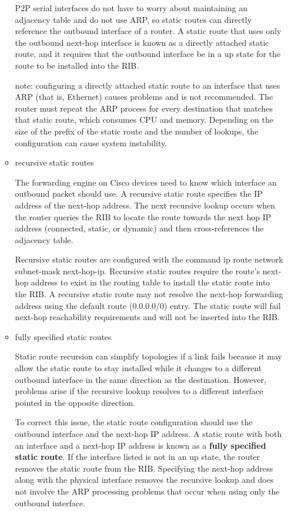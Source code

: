 \documentclass{article}
\begin{document}
\begin{itemize}
\begin{itemize}
		P2P serial interfaces do not have to worry about maintaining an adjacency table and do not use ARP, so static routes can directly reference the outbound interface of a router. A static route that uses only the outbound next-hop interface is known as a directly attached static route, and it requires that the outbound interface be in a up state for the route to be installed into the RIB.

		note: configuring a directly attached static route to an interface that uses ARP (that is, Ethernet) causes problems and is not recommended. The router must repeat the ARP process for every destination that matches that static route, which consumes CPU and memory. Depending on the size of the prefix of the static route and the number of lookups, the configuration can cause system instability.

	\item{recursive static routes}	

		The forwarding engine on Cisco devices need to know which interface an outbound packet should use. A recursive static route specifies the IP address of the next-hop address. The next recursive lookup occurs when the router queries the RIB to locate the route towards the next hop IP address (connected, static, or dynamic) and then cross-references the adjacency table.

		Recursive static routes are configured with the command ip route network subnet-mask next-hop-ip. Recursive static routes require the route’s next-hop address to exist in the routing table to install the static route into the RIB. A recursive static route may not resolve the next-hop forwarding address using the default route (0.0.0.0/0) entry. The static route will fail next-hop reachability requirements and will not be inserted into the RIB.	

	\item{fully specified static routes}

		Static route recursion can simplify topologies if a link fails because it may allow the static route to stay installed while it changes to a different outbound interface in the same direction as the destination. However, problems arise if the recursive lookup resolves to a different interface pointed in the opposite direction.

		To correct this issue, the static route configuration should use the outbound interface and the next-hop IP address. A static route with both an interface and a next-hop IP address is known as a \textbf{fully specified static route}. If the interface listed is not in an up state, the router removes the static route from the RIB. Specifying the next-hop address along with the physical interface removes the recursive lookup and does not involve the ARP processing problems that occur when using only the outbound interface.


\end{itemize}
\end{itemize}
\end{document}
